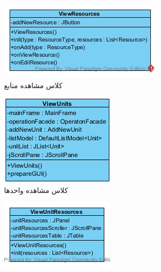 \begin{figure}[H]
	\begin{subfigure}[b]{0.5\textwidth}
		\includegraphics[width=\textwidth]{img/class-design/ui/ViewResources.jpg}
		\caption{کلاس مشاهده منابع}
	\end{subfigure}
\hfill
	\begin{subfigure}[b]{0.3\textwidth}
		\includegraphics[width=\textwidth]{img/class-design/ui/ViewUnits.png}
		\caption{کلاس مشاهده واحدها}
	\end{subfigure}
\hfill
	\begin{subfigure}[b]{0.3\textwidth}
		\includegraphics[width=\textwidth]{img/class-design/ui/ViewUnitResources}

\end{subfigure}
\end{figure}
